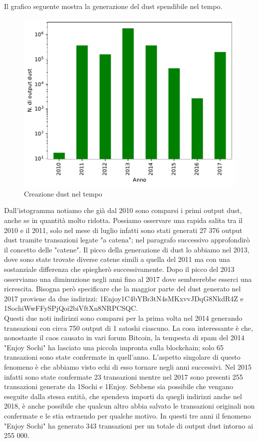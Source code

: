 Il grafico seguente mostra la generazione del dust spendibile nel tempo.
\begin{figure}[h!]
    \centering
    \includegraphics[scale=0.9]{Grafici/dust_created_year.pdf}
    \caption{Creazione dust nel tempo}
    \label{fig:dust_distribuzione}
\end{figure}
\FloatBarrier 
Dall'istogramma notiamo che già dal 2010 sono comparsi i primi output dust, anche se in quantità molto ridotta. Possiamo osservare una rapida salita tra il 2010 e il 2011, solo nel mese di luglio infatti sono stati generati 27 376 output dust tramite transazioni legate "a catena"; nel paragrafo successivo approfondirò il concetto delle "catene". 
Il picco della generazione di dust lo abbiamo nel 2013, dove sono state trovate diverse catene simili a quella del 2011 ma con una sostanziale differenza che spiegherò successivamente. Dopo il picco del 2013 osserviamo una diminuzione negli anni fino al 2017 dove sembrerebbe esserci una ricrescita. Bisogna però specificare che la maggior parte del dust generato nel 2017 proviene da due indirizzi: 1Enjoy1C4bYBr3tN4sMKxvvJDqG8NkdR4Z e 1SochiWwFFySPjQoi2biVftXn8NRPCSQC.\\Questi due noti indirizzi sono comparsi per la prima volta nel 2014 generando transazioni con circa 750 output di 1 satoshi ciascuno. La cosa interessante è che, nonostante il caos causato in vari forum Bitcoin, la tempesta di spam del 2014 "Enjoy Sochi" ha lasciato una piccola impronta sulla blockchain; solo 65 transazioni sono state confermate in quell'anno. L'aspetto singolare di questo fenomeno è che abbiamo visto echi di esso tornare negli anni successivi. Nel 2015 infatti sono state confermate 23 transazioni mentre nel 2017 sono presenti 255 transazioni generate da 1Sochi e 1Enjoy. Sebbene sia possibile che vengano eseguite dalla stessa entità, che spendeva importi da quegli indirizzi anche nel 2018, è anche possibile che qualcun altro abbia salvato le transazioni originali non confermate e le stia estraendo per qualche motivo. In questi tre anni il fenomeno "Enjoy Sochi" ha generato 343 transazioni per un totale di output dust intorno ai 255 000.\\\\
